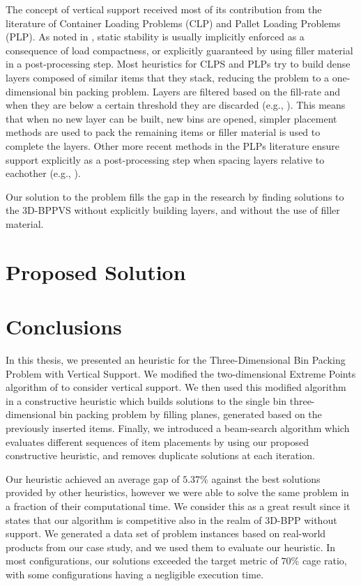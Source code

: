 \documentclass[11pt,a4paper,twocolumn]{article}
\begin{document}
The concept of vertical support received most of its contribution from the literature of Container Loading Problems (CLP) and Pallet Loading Problems (PLP).
As noted in \cite{BORTFELDT20131}, static stability is usually implicitly enforced as a consequence of load compactness, or explicitly guaranteed by using filler material in a post-processing step.
Most heuristics for CLPS and PLPs try to build dense layers composed of similar items that they stack, reducing the problem to a one-dimensional bin packing problem.
Layers are filtered based on the fill-rate and when they are below a certain threshold they are discarded (e.g., \cite{elhedhli2019three, Alonso2020}).
This means that when no new layer can be built, new bins are opened, simpler placement methods are used to pack the remaining items or filler material is used to complete the layers.
Other more recent methods in the PLPs literature ensure support explicitly as a post-processing step when spacing layers relative to eachother (e.g., \cite{GZARA20201062}).

Our solution to the problem fills the gap in the research by finding solutions to the 3D-BPPVS without explicitly building layers, and without the use of filler material.

\section{Proposed Solution}

\section{Conclusions}
In this thesis, we presented an heuristic for the Three-Dimensional Bin Packing Problem with Vertical Support.
We modified the two-dimensional Extreme Points algorithm of \citet{crainic2008extreme} to consider vertical support.
We then used this modified algorithm in a constructive heuristic which builds solutions to the single bin three-dimensional bin packing problem by filling planes, generated based on the previously inserted items.
Finally, we introduced a beam-search algorithm which evaluates different sequences of item placements by using our proposed constructive heuristic, and removes duplicate solutions at each iteration.

Our heuristic achieved an average gap of $5.37\%$ against the best solutions provided by other heuristics, however we were able to solve the same problem in a fraction of their computational time.
We consider this as a great result since it states that our algorithm is competitive also in the realm of 3D-BPP without support.
We generated a data set of problem instances based on real-world products from our case study, and we used them to evaluate our heuristic.
In most configurations, our solutions exceeded the target metric of $70\%$ cage ratio, with some configurations having a negligible execution time.
\end{document}
